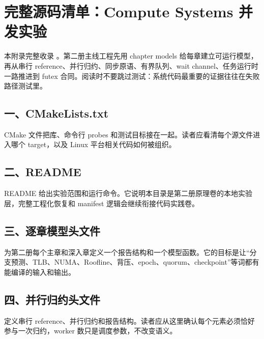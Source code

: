 \chapter{完整源码清单：Compute Systems 并发实验}

本附录完整收录 。第二册主线工程先用 chapter models 给每章建立可运行模型，再从串行 reference、并行归约、同步原语、有界队列、wait channel、任务运行时一路推进到 futex 合同。阅读时不要跳过测试：系统代码最重要的证据往往在失败路径测试里。

\section{一、CMakeLists.txt}

CMake 文件把库、命令行 probes 和测试目标接在一起。读者应看清每个源文件进入哪个 target，以及 Linux 平台相关代码如何被组织。



\section{二、README}

README 给出实验范围和运行命令。它说明本目录是第二册原理卷的本地实验层，完整工程化恢复和 manifest 逻辑会继续衔接代码实践卷。



\section{三、逐章模型头文件}

 为第二册每个主章和深入章定义一个报告结构和一个模型函数。它的目标是让“分支预测、TLB、NUMA、Roofline、背压、epoch、quorum、checkpoint”等词都有能编译的输入和输出。



\section{四、并行归约头文件}

 定义串行 reference、并行归约和报告结构。读者应从这里确认每个元素必须恰好参与一次归约，worker 数只是调度参数，不改变语义。

